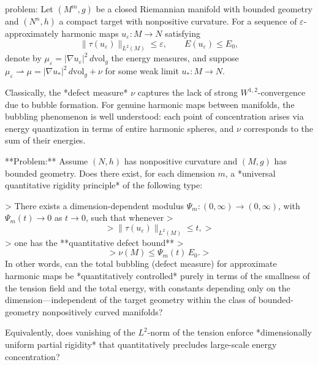 problem:  
Let \( (M^m,g) \) be a closed Riemannian manifold with bounded geometry and \( (N^n,h) \) a compact target with nonpositive curvature.  
For a sequence of \( \varepsilon \)-approximately harmonic maps \(u_\varepsilon : M \to N\) satisfying
\[
\|\tau(u_\varepsilon)\|_{L^2(M)} \le \varepsilon, \qquad E(u_\varepsilon) \le E_0,
\]
denote by \(\mu_\varepsilon = |\nabla u_\varepsilon|^2\,d\mathrm{vol}_g\) the energy measures, and suppose \( \mu_\varepsilon \rightharpoonup \mu = |\nabla u_*|^2\,d\mathrm{vol}_g + \nu \) for some weak limit \(u_*:M\to N\).  

Classically, the *defect measure* \( \nu \) captures the lack of strong \(W^{1,2}\)-convergence due to bubble formation. For genuine harmonic maps between manifolds, the bubbling phenomenon is well understood: each point of concentration arises via energy quantization in terms of entire harmonic spheres, and \(\nu\) corresponds to the sum of their energies.  

**Problem:**  
Assume \( (N,h) \) has nonpositive curvature and \( (M,g) \) has bounded geometry. Does there exist, for each dimension \(m\), a *universal quantitative rigidity principle* of the following type:

> There exists a dimension-dependent modulus \( \Psi_m:(0,\infty)\to(0,\infty)\), with \(\Psi_m(t)\to 0\) as \(t\to 0\), such that whenever  
> \[
> \|\tau(u_\varepsilon)\|_{L^2(M)} \le t,
> \]
> one has the **quantitative defect bound**
> \[
> \nu(M) \le \Psi_m(t)\,E_0.
> \]
In other words, can the total bubbling (defect measure) for approximate harmonic maps be *quantitatively controlled* purely in terms of the smallness of the tension field and the total energy, with constants depending only on the dimension—independent of the target geometry within the class of bounded-geometry nonpositively curved manifolds?  

Equivalently, does vanishing of the \(L^2\)-norm of the tension enforce *dimensionally uniform partial rigidity* that quantitatively precludes large-scale energy concentration?  

